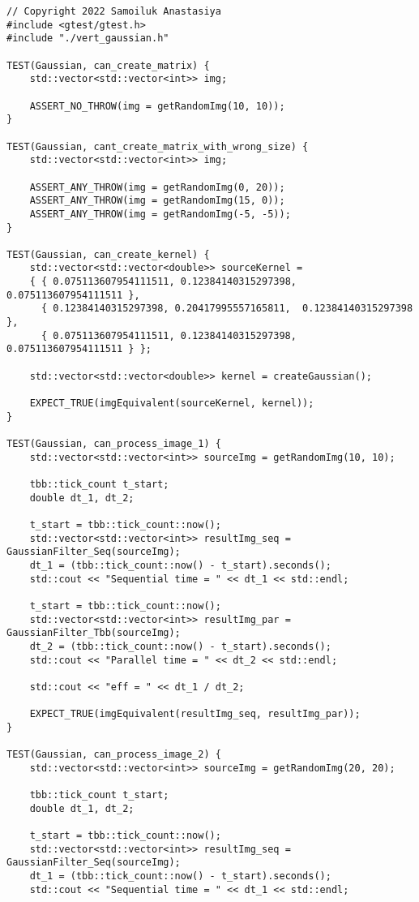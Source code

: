 \documentclass{report}
\begin{document}
\begin{lstlisting}
// Copyright 2022 Samoiluk Anastasiya
#include <gtest/gtest.h>
#include "./vert_gaussian.h"

TEST(Gaussian, can_create_matrix) {
    std::vector<std::vector<int>> img;

    ASSERT_NO_THROW(img = getRandomImg(10, 10));
}

TEST(Gaussian, cant_create_matrix_with_wrong_size) {
    std::vector<std::vector<int>> img;

    ASSERT_ANY_THROW(img = getRandomImg(0, 20));
    ASSERT_ANY_THROW(img = getRandomImg(15, 0));
    ASSERT_ANY_THROW(img = getRandomImg(-5, -5));
}

TEST(Gaussian, can_create_kernel) {
    std::vector<std::vector<double>> sourceKernel =
    { { 0.075113607954111511, 0.12384140315297398, 0.075113607954111511 },
      { 0.12384140315297398, 0.20417995557165811,  0.12384140315297398 },
      { 0.075113607954111511, 0.12384140315297398, 0.075113607954111511 } };

    std::vector<std::vector<double>> kernel = createGaussian();

    EXPECT_TRUE(imgEquivalent(sourceKernel, kernel));
}

TEST(Gaussian, can_process_image_1) {
    std::vector<std::vector<int>> sourceImg = getRandomImg(10, 10);

    tbb::tick_count t_start;
    double dt_1, dt_2;

    t_start = tbb::tick_count::now();
    std::vector<std::vector<int>> resultImg_seq = GaussianFilter_Seq(sourceImg);
    dt_1 = (tbb::tick_count::now() - t_start).seconds();
    std::cout << "Sequential time = " << dt_1 << std::endl;

    t_start = tbb::tick_count::now();
    std::vector<std::vector<int>> resultImg_par = GaussianFilter_Tbb(sourceImg);
    dt_2 = (tbb::tick_count::now() - t_start).seconds();
    std::cout << "Parallel time = " << dt_2 << std::endl;

    std::cout << "eff = " << dt_1 / dt_2;

    EXPECT_TRUE(imgEquivalent(resultImg_seq, resultImg_par));
}

TEST(Gaussian, can_process_image_2) {
    std::vector<std::vector<int>> sourceImg = getRandomImg(20, 20);

    tbb::tick_count t_start;
    double dt_1, dt_2;

    t_start = tbb::tick_count::now();
    std::vector<std::vector<int>> resultImg_seq = GaussianFilter_Seq(sourceImg);
    dt_1 = (tbb::tick_count::now() - t_start).seconds();
    std::cout << "Sequential time = " << dt_1 << std::endl;


\end{lstlisting}
\end{document}
